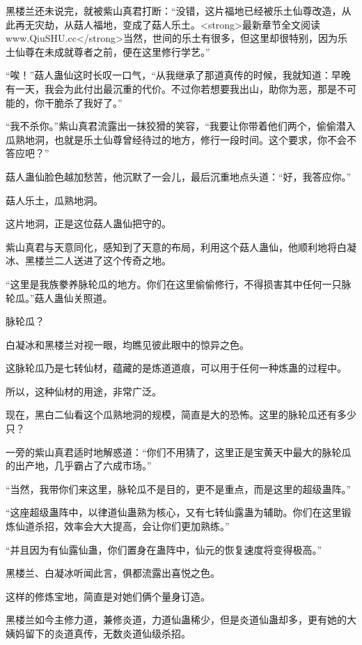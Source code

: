 
\begin{this_body}

黑楼兰还未说完，就被紫山真君打断：“没错，这片福地已经被乐土仙尊改造，从此再无灾劫，从菇人福地，变成了菇人乐土。<strong>最新章节全文阅读www.QiuSHU.cc</strong>当然，世间的乐土有很多，但这里却很特别，因为乐土仙尊在未成就尊者之前，便在这里修行学艺。”

“唉！”菇人蛊仙这时长叹一口气，“从我继承了那道真传的时候，我就知道：早晚有一天，我会为此付出最沉重的代价。不过你若想要我出山，助你为恶，那是不可能的，你干脆杀了我好了。”

“我不杀你。”紫山真君流露出一抹狡猾的笑容，“我要让你带着他们两个，偷偷潜入瓜熟地洞，也就是乐土仙尊曾经待过的地方，修行一段时间。这个要求，你不会不答应吧？”

菇人蛊仙脸色越加愁苦，他沉默了一会儿，最后沉重地点头道：“好，我答应你。”

菇人乐土，瓜熟地洞。

这片地洞，正是这位菇人蛊仙把守的。

紫山真君与天意同化，感知到了天意的布局，利用这个菇人蛊仙，他顺利地将白凝冰、黑楼兰二人送进了这个传奇之地。

“这里是我族豢养脉轮瓜的地方。你们在这里偷偷修行，不得损害其中任何一只脉轮瓜。”菇人蛊仙关照道。

脉轮瓜？

白凝冰和黑楼兰对视一眼，均瞧见彼此眼中的惊异之色。

这脉轮瓜乃是七转仙材，蕴藏的是炼道道痕，可以用于任何一种炼蛊的过程中。

所以，这种仙材的用途，非常广泛。

现在，黑白二仙看这个瓜熟地洞的规模，简直是大的恐怖。这里的脉轮瓜还有多少只？

一旁的紫山真君适时地解惑道：“你们不用猜了，这里正是宝黄天中最大的脉轮瓜的出产地，几乎霸占了六成市场。”

“当然，我带你们来这里，脉轮瓜不是目的，更不是重点，而是这里的超级蛊阵。”

“这座超级蛊阵中，以律道仙蛊熟为核心，又有七转仙露蛊为辅助。你们在这里锻炼仙道杀招，效率会大大提高，会让你们更加熟练。”

“并且因为有仙露仙蛊，你们置身在蛊阵中，仙元的恢复速度将变得极高。”

黑楼兰、白凝冰听闻此言，俱都流露出喜悦之色。

这样的修炼宝地，简直是对她们俩个量身订造。

黑楼兰如今主修力道，兼修炎道，力道仙蛊稀少，但是炎道仙蛊却多，更有她的大姨妈留下的炎道真传，无数炎道仙级杀招。


\end{this_body}
